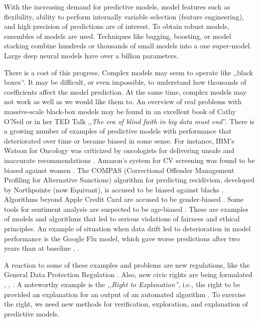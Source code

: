 \documentclass[]{krantz}
\begin{document}
With the increasing demand for predictive models, model features such as flexibility, ability to perform internally variable selection (feature engineering), and high precision of predictions are of interest. To obtain robust models, ensembles of models are used. Techniques like bagging, boosting, or model stacking combine hundreds or thousands of small models into a one super-model. Large deep neural models have over a billion parameters.

There is a cost of this progress. Complex models may seem to operate like ,,black boxes'`. It may be difficult, or even impossible, to understand how thousands of coefficients affect the model prediction. At the same time, complex models may not work as well as we would like them to. An overview of real problems with massive-scale black-box models may be found in an excellent book of Cathy O'Neil \citep{ONeil} or in her TED Talk ,,\emph{The era of blind faith in big data must end}''. There is a growing number of examples of predictive models with performance that deteriorated over time or became biased in some sense. For instance, IBM's Watson for Oncology was criticized by oncologists for delivering unsafe and inaccurate recommendations \citep{IBMWatson}. Amazon's system for CV screening was found to be biased against women \citep{AmazonAI}. The COMPAS (Correctional Offender Management Profiling for Alternative Sanctions) algorithm for predicting recidivism, developed by Northpointe (now Equivant), is accused to be biased against blacks \citep{COMPAS}. Algorithms beyond Apple Credit Card are accused to be gender-biased \citep{AppleCreditCard}. Some tools for sentiment analysis are suspected to be age-biased \citep{Diaz2018}. These are examples of models and algorithms that led to serious violations of fairness and ethical principles. An example of situation when data drift led to deterioration in model performance is the Google Flu model, which gave worse predictions after two years than at baseline \citep{GoogleFLU}, \citep{Lazer1203}.

A reaction to some of these examples and problems are new regulations, like the General Data Protection Regulation \citep{EUGDPR}. Also, new civic rights are being formulated \citep{RightToExpl}, \citep{RightToExpl2}, \citep{RightToExpl3}. A noteworthy example is the \emph{,,Right to Explanation''}, i.e., the right to be provided an explanation for an output of an automated algorithm \citep{RightToExpl}. To exercise the right, we need new methods for verification, exploration, and explanation of predictive models.
\end{document}
